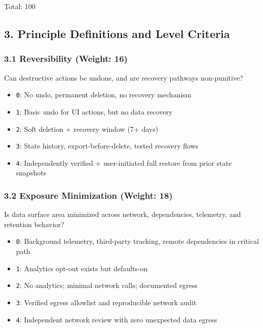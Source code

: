 \documentclass[
]{article}
\providecommand{\tightlist}{%
  \setlength{\itemsep}{0pt}\setlength{\parskip}{0pt}}
\begin{document}
Total: 100

\subsection{3. Principle Definitions and Level
Criteria}\label{3-principle-definitions-and-level-criteria}

\subsubsection{3.1 Reversibility (Weight:
16)}\label{31-reversibility-weight-16}

Can destructive actions be undone, and are recovery pathways
non-punitive?

\begin{itemize}
\tightlist
\item
  \texttt{0}: No undo, permanent deletion, no recovery mechanism
\item
  \texttt{1}: Basic undo for UI actions, but no data recovery
\item
  \texttt{2}: Soft deletion + recovery window (7+ days)
\item
  \texttt{3}: State history, export-before-delete, tested recovery flows
\item
  \texttt{4}: Independently verified + user-initiated full restore from
  prior state snapshots
\end{itemize}

\subsubsection{3.2 Exposure Minimization (Weight:
18)}\label{32-exposure-minimization-weight-18}

Is data surface area minimized across network, dependencies, telemetry,
and retention behavior?

\begin{itemize}
\tightlist
\item
  \texttt{0}: Background telemetry, third-party tracking, remote
  dependencies in critical path
\item
  \texttt{1}: Analytics opt-out exists but defaults-on
\item
  \texttt{2}: No analytics; minimal network calls; documented egress
\item
  \texttt{3}: Verified egress allowlist and reproducible network audit
\item
  \texttt{4}: Independent network review with zero unexpected data
  egress
\end{itemize}
\end{document}
